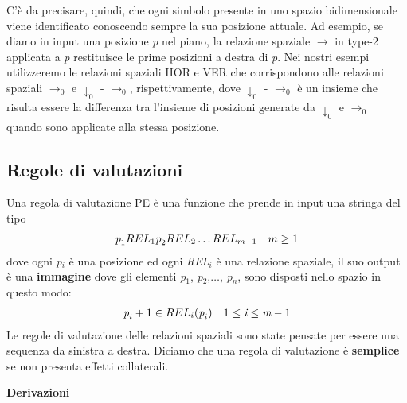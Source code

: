 C'è da precisare, quindi, che ogni simbolo presente in uno spazio bidimensionale viene identificato conoscendo sempre la sua posizione attuale. Ad esempio, se diamo in input una posizione \textit{p} nel piano, la relazione spaziale $\to$ in type-2 applicata a \textit{p} restituisce le prime posizioni a destra di \textit{p}.
Nei nostri esempi utilizzeremo le relazioni spaziali HOR e VER che corrispondono alle relazioni spaziali $\to_0$ e $\downarrow_0$ - $\to_0$, rispettivamente, dove $\downarrow_0$ - $\to_0$ è un insieme che risulta essere la differenza tra l'insieme di posizioni generate da $\downarrow_0$ e $\to_0$ quando sono applicate alla stessa posizione. 
\subsection{Regole di valutazioni}
Una regola di valutazione PE \cite{pubblicazione: tomita} è una funzione che prende in input una stringa del tipo 
\begin{align}
	\textit{p}_1 REL_1 \textit{p}_2 REL_2 \dots REL_{m-1} \quad    m \ge 1 \notag
\end{align}
dove ogni \textit{p}$_i$ è una posizione ed ogni \textit{REL}$_i$ è una relazione spaziale, il suo output è una \textbf{immagine} dove gli elementi \textit{p}$_1$, \textit{p}$_2$,$\dots$, \textit{p}$_n$, sono disposti nello spazio in questo modo:
\begin{align}
	\textit{p}_i+1 \in REL_i (\textit{p}_i)  \quad    1\le \textit{i} \le \textit{m}-1 \notag
\end{align}
Le regole di valutazione delle relazioni spaziali sono state pensate per essere una sequenza da sinistra a destra. Diciamo che una regola di valutazione è \textbf{semplice} se non presenta effetti collaterali.\par
\vspace{0.5cm}
\noindent \textbf{Derivazioni}\\
